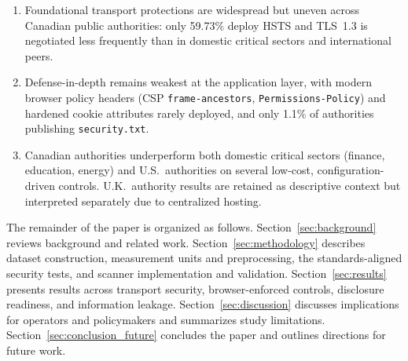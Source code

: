 \documentclass[a4paper,fleqn]{cas-sc}
\begin{document}
    \begin{enumerate}
    \item Foundational transport protections are widespread but uneven across Canadian public authorities: only 59.73\% deploy HSTS and TLS~1.3 is negotiated less frequently than in domestic critical sectors and international peers.
    \item Defense-in-depth remains weakest at the application layer, with modern browser policy headers (CSP \texttt{frame-ancestors}, \texttt{Permissions-Policy}) and hardened cookie attributes rarely deployed, and only 1.1\% of authorities publishing \texttt{security.txt}.
    \item Canadian authorities underperform both domestic critical sectors (finance, education, energy) and U.S.\ authorities on several low-cost, configuration-driven controls. U.K.\ authority results are retained as descriptive context but interpreted separately due to centralized hosting.
\end{enumerate}


The remainder of the paper is organized as follows. Section~\ref{sec:background} reviews background and related work. Section~\ref{sec:methodology} describes dataset construction, measurement units and preprocessing, the standards-aligned security tests, and scanner implementation and validation. Section~\ref{sec:results} presents results across transport security, browser-enforced controls, disclosure readiness, and information leakage. Section~\ref{sec:discussion} discusses implications for operators and policymakers and summarizes study limitations. Section~\ref{sec:conclusion_future} concludes the paper and outlines directions for future work.
\end{document}
